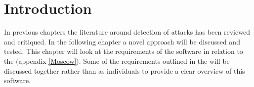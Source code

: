 
\section*{Introduction}
In previous chapters the literature around detection of attacks has been reviewed and critiqued. In the following chapter a novel approach will be discussed and tested. This chapter will look at the requirements of the software in relation to the  (appendix \ref{Moscow}). Some of the requirements outlined in the  will be discussed together rather than as individuals to provide a clear overview of this software.